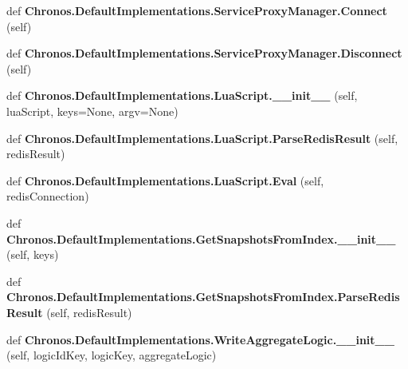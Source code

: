 \begin{DoxyCompactItemize}
\item 
def {\bfseries Chronos.\+Default\+Implementations.\+Service\+Proxy\+Manager.\+Connect} (self)\hypertarget{group__Chronos_ga815b53d0ab1457aaa9c7d8f70ca1c29a}{}\label{group__Chronos_ga815b53d0ab1457aaa9c7d8f70ca1c29a}

\item 
def {\bfseries Chronos.\+Default\+Implementations.\+Service\+Proxy\+Manager.\+Disconnect} (self)\hypertarget{group__Chronos_ga634f86290f6d550c6ba209cbcd973ae2}{}\label{group__Chronos_ga634f86290f6d550c6ba209cbcd973ae2}

\item 
def {\bfseries Chronos.\+Default\+Implementations.\+Lua\+Script.\+\_\+\+\_\+init\+\_\+\+\_\+} (self, lua\+Script, keys=None, argv=None)\hypertarget{group__Chronos_ga0b3e8e3654f467f7ab028f2ba6b5c961}{}\label{group__Chronos_ga0b3e8e3654f467f7ab028f2ba6b5c961}

\item 
def {\bfseries Chronos.\+Default\+Implementations.\+Lua\+Script.\+Parse\+Redis\+Result} (self, redis\+Result)\hypertarget{group__Chronos_ga8a05cd82246db24482d02c3b0c8eb268}{}\label{group__Chronos_ga8a05cd82246db24482d02c3b0c8eb268}

\item 
def {\bfseries Chronos.\+Default\+Implementations.\+Lua\+Script.\+Eval} (self, redis\+Connection)\hypertarget{group__Chronos_ga254dfc62ed3e73ba48ed77e4b17cbd29}{}\label{group__Chronos_ga254dfc62ed3e73ba48ed77e4b17cbd29}

\item 
def {\bfseries Chronos.\+Default\+Implementations.\+Get\+Snapshots\+From\+Index.\+\_\+\+\_\+init\+\_\+\+\_\+} (self, keys)\hypertarget{group__Chronos_gacb957410aabad7d3af29b946b2c2f6c4}{}\label{group__Chronos_gacb957410aabad7d3af29b946b2c2f6c4}

\item 
def {\bfseries Chronos.\+Default\+Implementations.\+Get\+Snapshots\+From\+Index.\+Parse\+Redis\+Result} (self, redis\+Result)\hypertarget{group__Chronos_gaf29b5ee290dbdb3bb3c6e62064eb3b5b}{}\label{group__Chronos_gaf29b5ee290dbdb3bb3c6e62064eb3b5b}

\item 
def {\bfseries Chronos.\+Default\+Implementations.\+Write\+Aggregate\+Logic.\+\_\+\+\_\+init\+\_\+\+\_\+} (self, logic\+Id\+Key, logic\+Key, aggregate\+Logic)\hypertarget{group__Chronos_gafd348e8b616c79e19521f3b36c71b78a}{}\label{group__Chronos_gafd348e8b616c79e19521f3b36c71b78a}


\end{DoxyCompactItemize}
